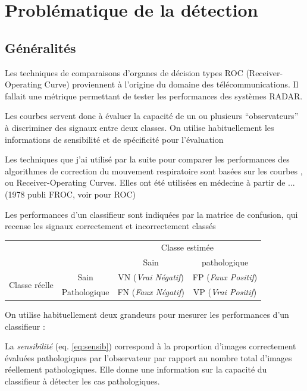 \chapter{Problématique de la détection}
	\section{Généralités}

Les techniques de comparaisons d'organes de décision types ROC (Receiver-Operating Curve) proviennent à l'origine du domaine des télécommunications. Il fallait une métrique permettant de tester les performances des systèmes RADAR\cite{zou2007receiver}.

Les courbes \ROC servent donc à évaluer la capacité de un ou plusieurs ``observateurs'' à discriminer des signaux entre deux classes. On utilise habituellement les informations de sensibilité et de spécificité pour l'évaluation

Les techniques que j'ai utilisé par la suite pour comparer les performances des algorithmes de correction du mouvement respiratoire sont basées sur les courbes \ROC, ou Receiver-Operating Curves. Elles ont été utilisées en médecine à partir de ... (1978 publi FROC, voir pour ROC)

Les performances d'un classifieur sont indiquées par la matrice de confusion, qui recense les signaux correctement et incorrectement classés 

\begin{tabular}{cc c|c|}
	
	& & \multicolumn{2}{c}{Classe estimée} \\
	\cline{3-4}	
	& & \multicolumn{1}{|c|}{Sain} & pathologique \\ 
	\cline{2-4}
	\multicolumn{1}{c|}{\multirow{2}{*}{Classe réelle}} & \multicolumn{1}{|c|}{Sain} & VN (\emph{Vrai Négatif}) & FP (\emph{Faux Positif})\\
	\cline{2-4}
	\multicolumn{1}{c|}{} & \multicolumn{1}{|c|}{Pathologique} & FN (\emph{Faux Négatif}) & VP (\emph{Vrai Positif})\\
	\cline{2-4}
\end{tabular}


On utilise habituellement deux grandeurs pour mesurer les performances d'un classifieur :

La \emph{sensibilité} (eq. \ref{eq:sensib}) correspond à la proportion d'images correctement évaluées pathologiques par l'observateur par rapport au nombre total d'images réellement pathologiques. Elle donne une information sur la capacité du classifieur à détecter les cas pathologiques.

